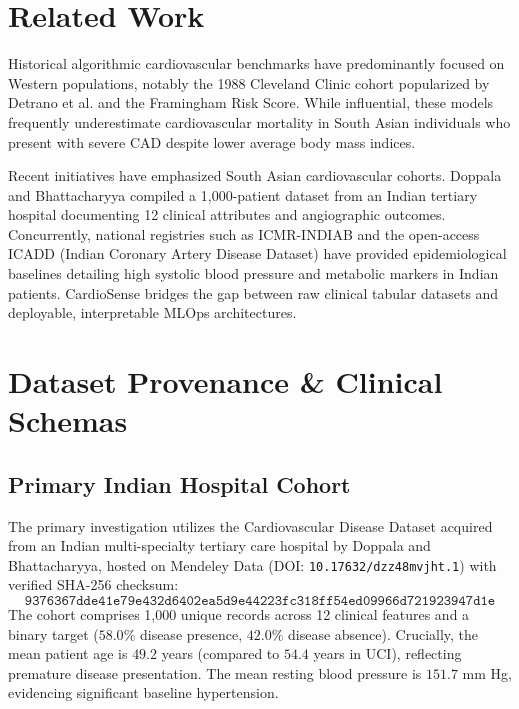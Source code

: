 \documentclass[journal]{IEEEtran}
\begin{document}
\section{Related Work}
Historical algorithmic cardiovascular benchmarks have predominantly focused on Western populations, notably the 1988 Cleveland Clinic cohort popularized by Detrano et al. and the Framingham Risk Score. While influential, these models frequently underestimate cardiovascular mortality in South Asian individuals who present with severe CAD despite lower average body mass indices.

Recent initiatives have emphasized South Asian cardiovascular cohorts. Doppala and Bhattacharyya compiled a 1,000-patient dataset from an Indian tertiary hospital documenting 12 clinical attributes and angiographic outcomes. Concurrently, national registries such as ICMR-INDIAB and the open-access ICADD (Indian Coronary Artery Disease Dataset) have provided epidemiological baselines detailing high systolic blood pressure and metabolic markers in Indian patients. CardioSense bridges the gap between raw clinical tabular datasets and deployable, interpretable MLOps architectures.

\section{Dataset Provenance \& Clinical Schemas}

\subsection{Primary Indian Hospital Cohort}
The primary investigation utilizes the Cardiovascular Disease Dataset acquired from an Indian multi-specialty tertiary care hospital by Doppala and Bhattacharyya, hosted on Mendeley Data (DOI: \texttt{10.17632/dzz48mvjht.1}) with verified SHA-256 checksum:
$$\texttt{9376367dde41e79e432d6402ea5d9e44223fc318ff54ed09966d721923947d1e}$$
The cohort comprises 1,000 unique records across 12 clinical features and a binary target ($58.0\%$ disease presence, $42.0\%$ disease absence). Crucially, the mean patient age is $49.2$ years (compared to $54.4$ years in UCI), reflecting premature disease presentation. The mean resting blood pressure is $151.7$ mm Hg, evidencing significant baseline hypertension.
\end{document}
